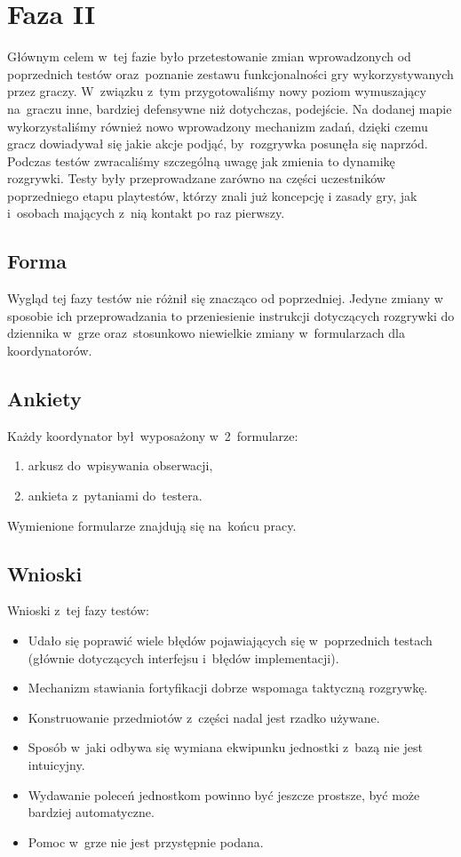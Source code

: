 \documentclass[licencjacka]{pracamgr}
\begin{document}
  \section{Faza II}
    Głównym celem w~tej fazie było przetestowanie zmian wprowadzonych od poprzednich testów oraz~poznanie zestawu
    funkcjonalności gry wykorzystywanych przez graczy. W~związku z~tym przygotowaliśmy nowy poziom wymuszający na~graczu
    inne, bardziej defensywne niż dotychczas, podejście. Na dodanej mapie wykorzystaliśmy również nowo wprowadzony
    mechanizm zadań, dzięki czemu gracz dowiadywał się jakie akcje podjąć, by~rozgrywka posunęła się naprzód. Podczas
    testów zwracaliśmy szczególną uwagę jak zmienia to dynamikę rozgrywki. Testy były przeprowadzane zarówno na
    części uczestników poprzedniego etapu playtestów, którzy znali już koncepcję i zasady gry, jak i~osobach mających
    z~nią kontakt po raz pierwszy.

    \subsection{Forma}
      Wygląd tej fazy testów nie różnił się znacząco od poprzedniej. Jedyne zmiany w sposobie ich przeprowadzania to
      przeniesienie instrukcji dotyczących rozgrywki do dziennika w~grze oraz~stosunkowo niewielkie zmiany w~formularzach
      dla koordynatorów.

    \subsection{Ankiety}
      Każdy koordynator był~wyposażony w~2~formularze:
      \begin{enumerate}
        \item arkusz do~wpisywania obserwacji,
        \item ankieta z~pytaniami do~testera.
      \end{enumerate}

      \noindent
      Wymienione formularze znajdują się na~końcu pracy.

    \subsection{Wnioski}
      Wnioski z~tej fazy testów:
      \begin{itemize}
        \item Udało się poprawić wiele błędów pojawiających się w~poprzednich testach (głównie dotyczących interfejsu
        i~błędów implementacji).
        \item Mechanizm stawiania fortyfikacji dobrze wspomaga taktyczną rozgrywkę.
        \item Konstruowanie przedmiotów z~części nadal jest rzadko używane.
        \item Sposób w~jaki odbywa się wymiana ekwipunku jednostki z~bazą nie jest intuicyjny.
        \item Wydawanie poleceń jednostkom powinno być jeszcze prostsze, być może bardziej automatyczne.
        \item Pomoc w~grze nie jest przystępnie podana.
      \end{itemize}
\end{document}
